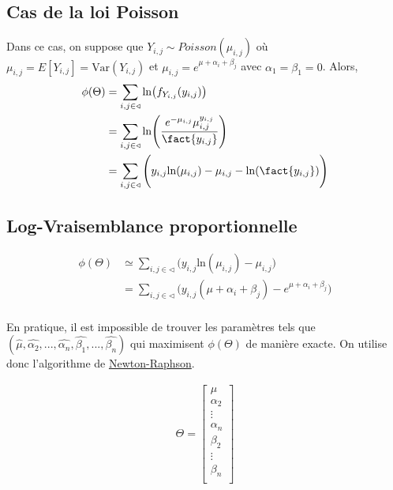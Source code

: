 \subsection*{Cas de la loi Poisson}
Dans ce cas, on suppose que $Y_{i,j} \sim Poisson(\mu_{i,j})$ où $\mu_{i,j} = E[Y_{i,j}] = \text{Var}(Y_{i,j})$ et $\mu_{i,j} = e^{\mu + \alpha_i + \beta_j}$ avec $\alpha_1 = \beta_1 = 0$.
Alors, 
\begin{align*}
\phi(\Theta) &= \sum_{i, j \in \triangleleft} \text{ln} \big(f_{Y_{i,j}}(y_{i,j}) \big) \\
&= \sum_{i, j \in \triangleleft} \text{ln} \Bigg( \frac{e^{-\mu_{i,j}} \mu_{i,j}^{y_{i,j}}}{\fact{ y_{i,j}}} \Bigg) \\
&= \sum_{i, j \in \triangleleft} \Bigg( y_{i,j} \text{ln}(\mu_{i,j}) -\mu_{i,j} - \text{ln}(\fact{ y_{i,j}}) \Bigg) \\
\end{align*}

\subsection*{Log-Vraisemblance proportionnelle}
\begin{align*}
\phi(\Theta) &\simeq \sum_{i, j \in \triangleleft} \Bigg( y_{i,j} \text{ln}(\mu_{i,j}) -\mu_{i,j} \Bigg) \\
&= \sum_{i, j \in \triangleleft} \Bigg( y_{i,j} (\mu + \alpha_i + \beta_j) - e^{\mu + \alpha_i + \beta_j} \Bigg) \\
\end{align*}

En pratique, il est impossible de trouver les paramètres tels que $( \widehat{\mu}, \widehat{\alpha_2}, ..., \widehat{\alpha_n}, \widehat{\beta_1},..., \widehat{\beta_n})$ qui maximisent $\phi(\Theta)$ de manière exacte. On utilise donc l'algorithme de  \href{https://fr.wikipedia.org/wiki/Méthode_de_Newton}{Newton-Raphson}.

\begin{align*}
\Theta =
\begin{bmatrix} 
\mu \\
\alpha_2 \\
\vdots \\
\alpha_n \\
\beta_2 \\
\vdots \\
\beta_n \\
\end{bmatrix}
\end{align*}

